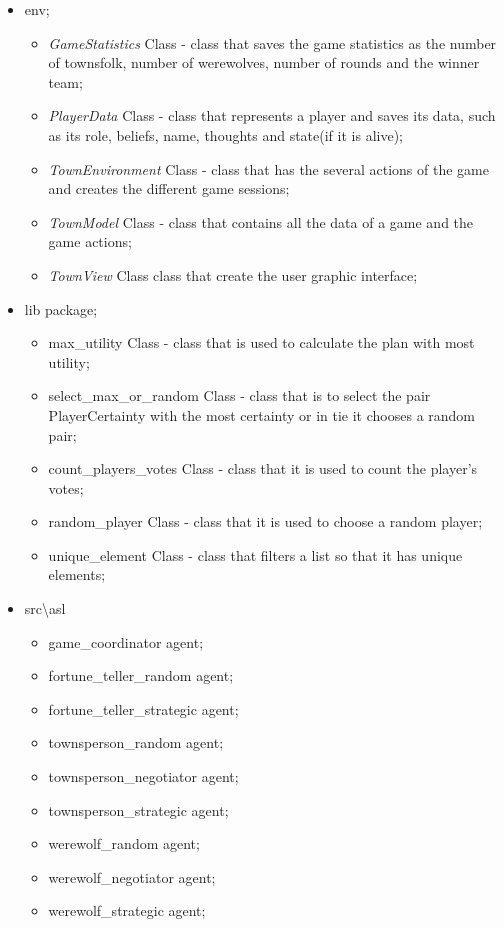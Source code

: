 \documentclass{article}
\begin{document}
\begin{itemize}
	\item env;
	\begin{itemize}
	 \item \textit{GameStatistics} Class - class that saves the game statistics as the number of townsfolk, number of werewolves, number of rounds and the winner team;
	 \item \textit{PlayerData} Class - class that represents a player and saves its data, such as its role, beliefs, name, thoughts and state(if it is alive);
	 \item \textit{TownEnvironment} Class - class that has the several actions of the game and creates the different game sessions;
	 \item \textit{TownModel} Class - class that contains all the data of a game and the game actions;
	 \item \textit{TownView} Class class that create the user graphic interface;
	\end{itemize}
	\item lib package;
		\begin{itemize}
			\item max\_utility Class - class that is used to calculate the plan with most utility;
			\item select\_max\_or\_random Class - class that is to select the pair Player\-Certainty with the most certainty or in tie it chooses a random pair;
			\item count\_players\_votes Class - class that it is used to count the player's votes;
			\item random\_player Class - class that it is used to choose a random player;
			\item unique\_element Class - class that filters a list so that it has unique elements;
		\end{itemize}
	\item src\textbackslash asl
	\begin{itemize}
		\item game\_coordinator agent;
		\item fortune\_teller\_random agent;
		\item fortune\_teller\_strategic agent;
		\item townsperson\_random agent;
		\item townsperson\_negotiator agent;
		\item townsperson\_strategic agent;
		\item werewolf\_random agent;
		\item werewolf\_negotiator agent;
		\item werewolf\_strategic agent;
	\end{itemize}

\end{itemize}
\end{document}
